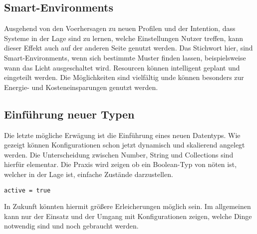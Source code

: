 \subsection{Smart-Environments}
Ausgehend von den Voerhersagen zu neuen Profilen und der Intention, dass Systeme in der Lage sind zu lernen, welche Einstellungen Nutzer treffen, kann dieser Effekt auch auf der anderen Seite genutzt werden. Das Stichwort hier, sind Smart-Environments, wenn sich bestimmte Muster finden lassen, beispielsweise wann das Licht ausgeschaltet wird. Resourcen können intelligent geplant und eingeteilt werden. Die Möglichkeiten sind vielfältig unde können besonders zur Energie- und Kosteneinsparungen genutzt werden.

\subsection{Einführung neuer Typen}
Die letzte mögliche Erwägung ist die Einführung eines neuen Datentyps. Wie gezeigt können Konfigurationen schon jetzt dynamisch und skalierend angelegt werden. Die Unterscheidung zwischen Number, String und Collections sind hierfür elementar. Die Praxis wird zeigen ob ein Boolean-Typ von nöten ist, welcher in der Lage ist, einfache Zustände darzustellen.
\lstset{language=bash}
\begin{lstlisting}[caption=Möglicher Boolean-Typ, captionpos=b]
	active = true
\end{lstlisting}

In Zukunft könnten hiermit größere Erleicherungen möglich sein. Im allgemeinen kann nur der Einsatz und der Umgang mit Konfigurationen zeigen, welche Dinge notwendig sind und noch gebraucht werden. 



